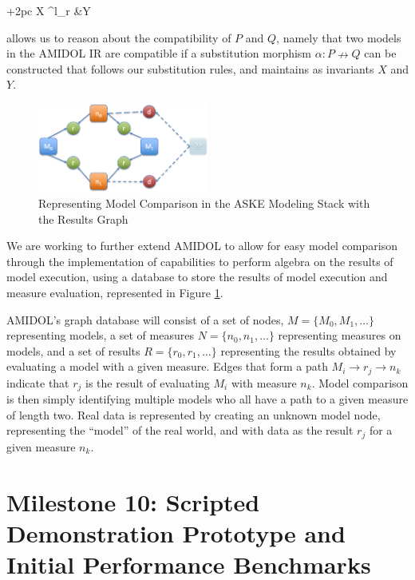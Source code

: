 \documentclass[12pt]{galois-whitepaper}
\begin{document}
\begin{center}
  \xymatrix@+2pc{
    X \rtwocell^l_r{\alpha} &Y\\
  }
\end{center}

allows us to reason about the compatibility of $P$ and $Q$, namely
 that two models in the AMIDOL IR are compatible if a substitution
 morphism $\alpha: P \nrightarrow Q$ can be constructed that follows
 our substitution rules, and maintains as invariants $X$ and $Y$.

   \begin{figure}
    \centering
    \includegraphics[width=0.5\textwidth]{AMIDOL-graph.png}
    \caption{Representing Model Comparison in the ASKE Modeling Stack
      with the Results Graph}
    \label{Fig:Results}
  \end{figure}

  We are working to further extend AMIDOL to allow for easy model
  comparison through the implementation of capabilities to perform
  algebra on the results of model execution, using a database to store
  the results of model execution and measure evaluation, represented
  in Figure \ref{Fig:Results}.

  AMIDOL's graph database will consist of a set of nodes, $M = \{M_0,
  M_1, \ldots\}$ representing models, a set of measures $N = \{n_0,
  n_1, \ldots\}$ representing measures on models, and a set of results
  $R = \{r_0, r_1, \ldots\} $ representing the results obtained by
  evaluating a model with a given measure.  Edges that form a path
  $M_i \rightarrow r_j \rightarrow n_k$ indicate that $r_j$ is the
  result of evaluating $M_i$ with measure $n_k$.  Model comparison is
  then simply identifying multiple models who all have a path to a
  given measure of length two.  Real data is represented by creating
  an unknown model node, representing the ``model'' of the real world,
  and with data as the result $r_j$ for a given measure $n_k$. 

\section{Milestone 10: Scripted Demonstration Prototype and Initial
  Performance Benchmarks}
\end{document}
